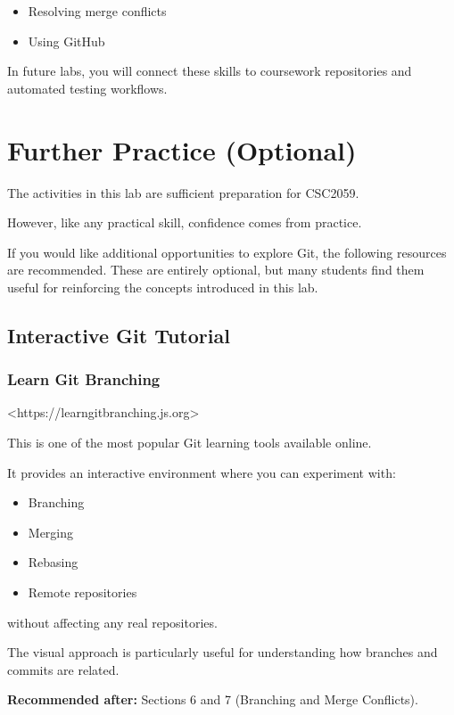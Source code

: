 \documentclass{csc2059practical}
\begin{document}
\begin{wrapupbox}
\begin{itemize}
  \item Resolving merge conflicts
\end{itemize}

\begin{itemize}
  \item Using GitHub
\end{itemize}

In future labs, you will connect these skills to coursework repositories and automated testing workflows.


\end{wrapupbox}
\section{Further Practice (Optional)}
The activities in this lab are sufficient preparation for CSC2059.

However, like any practical skill, confidence comes from practice.

If you would like additional opportunities to explore Git, the following resources are recommended. These are entirely optional, but many students find them useful for reinforcing the concepts introduced in this lab.

\subsection{Interactive Git Tutorial}
\subsubsection{Learn Git Branching}
<https://learngitbranching.js.org>

This is one of the most popular Git learning tools available online.

It provides an interactive environment where you can experiment with:

\begin{itemize}
  \item Branching
  \item Merging
  \item Rebasing
  \item Remote repositories
\end{itemize}
without affecting any real repositories.

The visual approach is particularly useful for understanding how branches and commits are related.

\textbf{Recommended after:} Sections 6 and 7 (Branching and Merge Conflicts).
\end{document}
